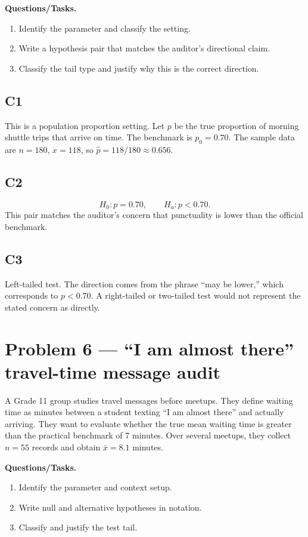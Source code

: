 	\textbf{Questions/Tasks.}
	\begin{enumerate}
		\item[(C1)] Identify the parameter and classify the setting.
		\item[(C2)] Write a hypothesis pair that matches the auditor's directional claim.
		\item[(C3)] Classify the tail type and justify why this is the correct direction.
	\end{enumerate}
	
	\subsection*{C1}
	This is a population proportion setting. Let \(p\) be the true proportion of morning shuttle trips that arrive on time. The benchmark is \(p_0=0.70\). The sample data are \(n=180\), \(x=118\), so \(\hat p=118/180\approx0.656\).
	
	\subsection*{C2}
	\[
	H_0\colon p=0.70, \qquad H_a\colon p<0.70.
	\]
	This pair matches the auditor's concern that punctuality is lower than the official benchmark.
	
	\subsection*{C3}
	Left-tailed test. The direction comes from the phrase ``may be lower,'' which corresponds to \(p<0.70\). A right-tailed or two-tailed test would not represent the stated concern as directly.


	\section{Problem 6 --- ``I am almost there'' travel-time message audit}
	A Grade 11 group studies travel messages before meetups. They define waiting time as minutes between a student texting ``I am almost there'' and actually arriving. They want to evaluate whether the true mean waiting time is greater than the practical benchmark of 7 minutes. Over several meetups, they collect \(n=55\) records and obtain \(\bar{x}=8.1\) minutes.
	
	\textbf{Questions/Tasks.}
	\begin{enumerate}
		\item[(C1)] Identify the parameter and context setup.
		\item[(C2)] Write null and alternative hypotheses in notation.
		\item[(C3)] Classify and justify the test tail.
	\end{enumerate}
	
